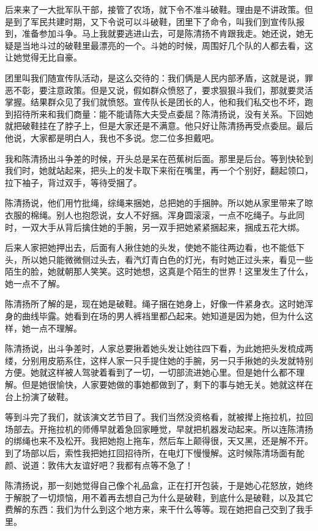  后来来了一大批军队干部，接管了农场，就下令不准斗破鞋。理由是不讲政策。但是到了军民共建时期，又下令说可以斗破鞋，团里下了命令，叫我们到宣传队报到，准备参加斗争。马上我就要逃进山去，可是陈清扬不肯跟我走。她还说，她无疑是当地斗过的破鞋里最漂亮的一个。斗她的时候，周围好几个队的人都去看，这让她觉得无比自豪。 
 
 团里叫我们随宣传队活动，是这么交待的：我们俩是人民内部矛盾，这就是说，罪恶不彰，要注意政策。但是又说，假如群众愤怒了，要求狠狠斗我们，那就要灵活掌握。结果群众见了我们就愤怒。宣传队长是团长的人，他和我们私交也不坏，跑到招待所来和我们商量：能不能请陈大夫受点委屈？陈清扬说，没有关系。下回她就把破鞋挂在了脖子上，但是大家还是不满意。他只好让陈清扬再受点委屈。最后他说，大家都是明白人，我也不多说。您二位多担戴吧。 
 
 我和陈清扬出斗争差的时候，开头总是呆在芭蕉树后面。那里是后台。等到快轮到我们时，她就站起来，把头上的发卡取下来衔在嘴里，再一个个别好，翻起领口，拉下袖子，背过双手，等待受捆了。 
 
 陈清扬说，他们用竹批绳，综绳来捆她，总把她的手捆肿。所以她从家里带来了晾衣服的棉绳。别人也抱怨说，女人不好捆。浑身圆滚滚，一点不吃绳子。与此同时，一双大手从背后擒住她的手腕，另一双手把她紧紧捆起来，捆成五花大绑。 
 
 后来人家把她押出去，后面有人揪住她的头发，使她不能往两边看，也不能低下头，所以她只能微微侧过头去，看汽灯青白色的灯光，有时她正过头来，看见一些陌生的脸，她就朝那人笑笑。这时她想，这真是个陌生的世界！这里发生了什么，她一点不了解。 
 
 陈清扬所了解的是，现在她是破鞋。绳子捆在她身上，好像一件紧身衣。这时她浑身的曲线毕露。她看到在场的男人裤裆里都凸起来。她知道是因为她，但为什么这样，她一点不理解。 
 
 陈清扬说，出斗争差时，人家总要揪着她头发让她往四下看，为此她把头发梳成两缕，分别用皮筋系住，这样人家一只手提住她的手腕，另一只手揪她的头发就特别方便。她就这样被人驾驶着看到了一切，一切部流进她心里。但是她什么都不理解。但是她很愉快，人家要她做的事她都做到了，剩下的事与她无关。她就这样在台上扮演了破鞋。 
 
 等到斗完了我们，就该演文艺节目了。我们当然没资格看，就被撵上拖拉机，拉回场部去。开拖拉机的师傅早就着急回家睡觉，早就把机器发动起来。所以连陈清扬的绑绳也来不及松开。我把她抱上拖车，然后车上颠得很，天又黑，还是解不开。到了场部以后，索性我把她扛回招待所，在电灯下慢慢解。这时候陈清场面有酡颜、说道：敦伟大友谊好吧？我都有点等不急了！ 
 
 陈清扬说，那一刻她觉得自己像个礼品盒，正在打开包装，于是她心花怒放，她终于解脱了一切烦恼，用不着再去想自己为什么是破鞋，到底什么是破鞋，以及其它费解的东西：我们为什么到这个地方来，来干什么等等。现在她把自己交到了我手里。 
 
